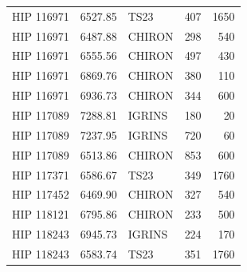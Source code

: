 \begin{scriptsize}
\begin{longtable}{|l|rlrr|}
  HIP 116971 &  6527.85 &       TS23 &      407 &  1650 \\
  HIP 116971 &  6487.88 &     CHIRON &      298 &   540 \\
  HIP 116971 &  6555.56 &     CHIRON &      497 &   430 \\
  HIP 116971 &  6869.76 &     CHIRON &      380 &   110 \\
  HIP 116971 &  6936.73 &     CHIRON &      344 &   600 \\
  HIP 117089 &  7288.81 &     IGRINS &      180 &    20 \\
  HIP 117089 &  7237.95 &     IGRINS &      720 &    60 \\
  HIP 117089 &  6513.86 &     CHIRON &      853 &   600 \\
  HIP 117371 &  6586.67 &       TS23 &      349 &  1760 \\
  HIP 117452 &  6469.90 &     CHIRON &      327 &   540 \\
  HIP 118121 &  6795.86 &     CHIRON &      233 &   500 \\
  HIP 118243 &  6945.73 &     IGRINS &      224 &   170 \\
  HIP 118243 &  6583.74 &       TS23 &      351 &  1760

\end{longtable}
\end{scriptsize}





